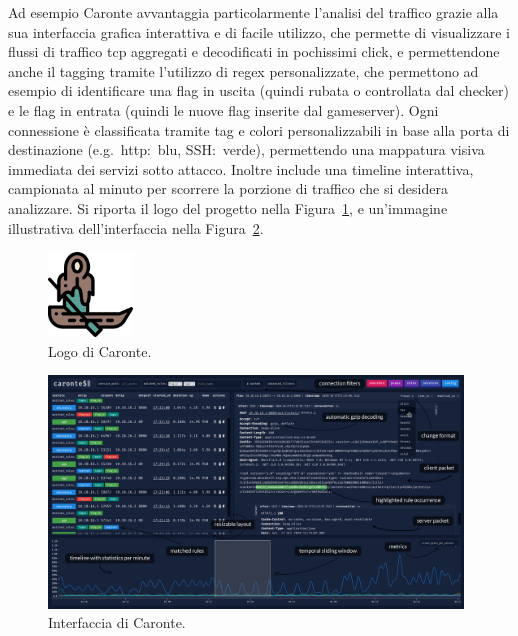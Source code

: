 Ad esempio Caronte avvantaggia particolarmente l'analisi del traffico grazie alla sua interfaccia grafica interattiva e di facile utilizzo, che permette di visualizzare i flussi di traffico \gls{tcp} aggregati e decodificati in pochissimi click, e permettendone anche il tagging tramite l'utilizzo di \gls{regex} personalizzate, che permettono ad esempio di identificare una flag in uscita (quindi rubata o controllata dal checker) e le flag in entrata (quindi le nuove flag inserite dal gameserver). Ogni connessione è classificata tramite tag e colori personalizzabili in base alla porta di destinazione (e.g.\ \gls{http}:\ blu, SSH:\ verde), permettendo una mappatura visiva immediata dei servizi sotto attacco. Inoltre include una timeline interattiva, campionata al minuto per scorrere la porzione di traffico che si desidera analizzare.
Si riporta il logo del progetto nella Figura~\ref{fig:caronte_logo}, e un'immagine illustrativa dell'interfaccia nella Figura~\ref{fig:caronte_interface}.

\begin{figure}[H]
    \centering
    \includegraphics[width=0.2\textwidth]{images/chapter1/CaronteLogo.png}
    \caption{Logo di Caronte.}\label{fig:caronte_logo}
\end{figure}

\begin{figure}[H]
    \centering
    \includegraphics[width=0.98\textwidth]{images/chapter1/caronte_interface.png}
    \caption{Interfaccia di Caronte.}\label{fig:caronte_interface}
\end{figure}

